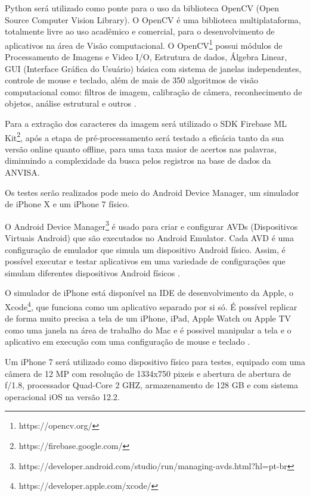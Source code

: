 Python será utilizado como ponte para o uso da biblioteca OpenCV (Open Source Computer Vision Library). O OpenCV é uma biblioteca multiplataforma, totalmente livre ao uso acadêmico e comercial, para o desenvolvimento de   aplicativos na área de Visão computacional. O OpenCV\footnote{https://opencv.org/}
possui módulos de Processamento de Imagens e Video I/O, Estrutura de dados, Álgebra Linear, GUI (Interface Gráfica do Usuário) básica com sistema de janelas independentes, controle de mouse e teclado, além de mais de 350 algoritmos de visão computacional como: filtros de imagem, calibração de câmera, reconhecimento de objetos, análise estrutural e outros \cite{RVOPENCV}. 

Para a extração dos caracteres da imagem será utilizado o SDK Firebase ML Kit\footnote{https://firebase.google.com/}, após a etapa de pré-processamento será testado a eficácia tanto da sua versão online quanto offline, para uma taxa maior de acertos nas palavras, diminuindo a complexidade da busca pelos registros na base de dados da ANVISA.

Os testes serão realizados pode meio do Android Device Manager, um simulador de iPhone X e um iPhone 7 físico. 

O Android Device Manager\footnote{https://developer.android.com/studio/run/managing-avds.html?hl=pt-br} é usado para criar e configurar AVDs (Dispositivos Virtuais Android) que são executados no Android Emulator. Cada AVD é uma configuração de emulador que simula um dispositivo Android físico. Assim, é possível executar e testar aplicativos em uma variedade de configurações que simulam diferentes dispositivos Android físicos  \cite{ADVDUNN}.

O simulador de iPhone está disponível na IDE de desenvolvimento da Apple, o Xcode\footnote{https://developer.apple.com/xcode/}, que funciona como um aplicativo separado por si só. É possível replicar de forma muito precisa a tela de um iPhone, iPad, Apple Watch ou Apple TV como uma janela na área de trabalho do Mac e é possivel manipular a tela e o aplicativo em execução com uma configuração de mouse e teclado \cite{IPHONESIMULATOR}.

Um iPhone 7 será utilizado como dispositivo físico  para testes, equipado com uma câmera de 12 MP com resolução de 1334x750 pixeis e abertura de abertura de ƒ/1.8, processador Quad-Core 2 GHZ, armazenamento de 128 GB e com sistema operacional iOS na versão 12.2.


